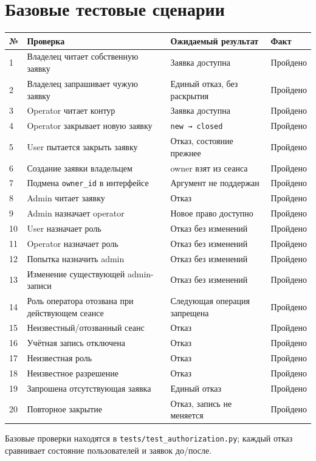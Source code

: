 \documentclass[12pt,a4paper]{article}
\begin{document}
\section{Базовые тестовые сценарии}
\begin{longtable}{p{0.7cm}p{7.2cm}p{4.1cm}p{2.2cm}}
\toprule № & Проверка & Ожидаемый результат & Факт \\
\midrule\endhead
1 & Владелец читает собственную заявку & Заявка доступна & Пройдено \\
2 & Владелец запрашивает чужую заявку & Единый отказ, без раскрытия & Пройдено \\
3 & Operator читает контур & Заявка доступна & Пройдено \\
4 & Operator закрывает новую заявку & \texttt{new → closed} & Пройдено \\
5 & User пытается закрыть заявку & Отказ, состояние прежнее & Пройдено \\
6 & Создание заявки владельцем & owner взят из сеанса & Пройдено \\
7 & Подмена \texttt{owner\_id} в интерфейсе & Аргумент не поддержан & Пройдено \\
8 & Admin читает заявку & Отказ & Пройдено \\
9 & Admin назначает operator & Новое право доступно & Пройдено \\
10 & User назначает роль & Отказ без изменений & Пройдено \\
11 & Operator назначает роль & Отказ без изменений & Пройдено \\
12 & Попытка назначить admin & Отказ без изменений & Пройдено \\
13 & Изменение существующей admin-записи & Отказ без изменений & Пройдено \\
14 & Роль оператора отозвана при действующем сеансе & Следующая операция запрещена & Пройдено \\
15 & Неизвестный/отозванный сеанс & Отказ & Пройдено \\
16 & Учётная запись отключена & Отказ & Пройдено \\
17 & Неизвестная роль & Отказ & Пройдено \\
18 & Неизвестное разрешение & Отказ & Пройдено \\
19 & Запрошена отсутствующая заявка & Единый отказ & Пройдено \\
20 & Повторное закрытие & Отказ, запись не меняется & Пройдено \\
\bottomrule
\end{longtable}
Базовые проверки находятся в \texttt{tests/test\_authorization.py}; каждый отказ сравнивает состояние пользователей и заявок до/после.
\end{document}
